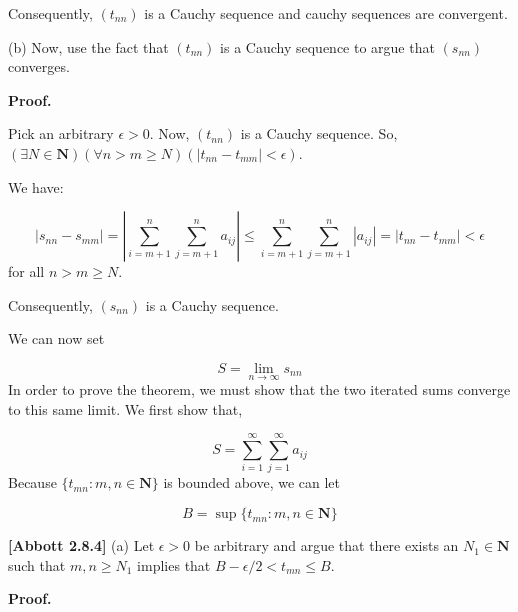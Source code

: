 \documentclass[10pt]{article}
\begin{document}
Consequently, $\displaystyle ( t_{nn})$ is a Cauchy sequence and cauchy sequences are convergent.



(b) Now, use the fact that $\displaystyle ( t_{nn})$ is a Cauchy sequence to argue that $\displaystyle ( s_{nn})$ converges. 



\textbf{Proof.}



Pick an arbitrary $\displaystyle \epsilon  >0$. Now, $\displaystyle ( t_{nn})$ is a Cauchy sequence. So, $\displaystyle ( \exists N\in \mathbf{N})( \forall n >m\geq N)( |t_{nn} -t_{mm} |< \epsilon )$. 



We have:


\begin{equation*}
|s_{nn} -s_{mm} |=\left| \sum _{i=m+1}^{n}\sum _{j=m+1}^{n} a_{ij}\right| \leq \sum _{i=m+1}^{n}\sum _{j=m+1}^{n} |a_{ij} |=|t_{nn} -t_{mm} |< \epsilon 
\end{equation*}
for all $\displaystyle n >m\geq N$.



Consequently, $\displaystyle ( s_{nn})$ is a Cauchy sequence. 



We can now set


\begin{equation*}
S=\lim _{n\rightarrow \infty } s_{nn}
\end{equation*}
In order to prove the theorem, we must show that the two iterated sums converge to this same limit. We first show that, 


\begin{equation*}
S=\sum _{i=1}^{\infty }\sum _{j=1}^{\infty } a_{ij}
\end{equation*}
Because $\displaystyle \{t_{mn} :m,n\in \mathbf{N}\}$ is bounded above, we can let 


\begin{equation*}
B=\sup \{t_{mn} :m,n\in \mathbf{N}\}
\end{equation*}


\textbf{[Abbott 2.8.4]} (a) Let $\displaystyle \epsilon  >0$ be arbitrary and argue that there exists an $\displaystyle N_{1} \in \mathbf{N}$ such that $\displaystyle m,n\geq N_{1}$ implies that $\displaystyle B-\epsilon /2< t_{mn} \leq B$.



\textbf{Proof.}
\end{document}
